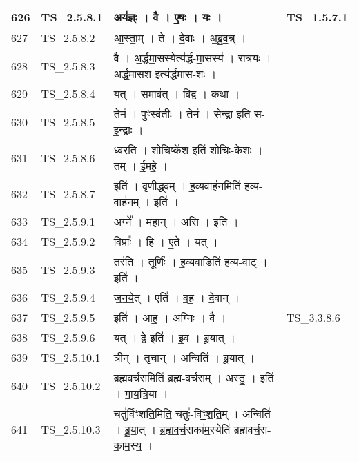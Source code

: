 \documentclass[17pt]{extarticle}
\begin{document}
\begin{longtable}{||p{0.4in}||p{0.9in}||p{4.0in}||p{0.9in}||}
        \hline
            626 & TS\_2.5.8.1 & अय॑ज्ञ्ः   ।   वै   ।   ए॒षः   ।   यः   ।    & TS\_1.5.7.1        \\
        \hline
            627 & TS\_2.5.8.2 & आ॒स्ता॒म्   ।   ते   ।   दे॒वाः   ।   अ॒ब्रु॒व॒न्न्   ।    &      \\
        \hline
            628 & TS\_2.5.8.3 & वै   ।   अ॒र्द्ध॒मा॒सस्येत्य॑र्द्ध{-}मा॒सस्य॑   ।   रात्र॑यः   ।   अ॒र्द्ध॒मा॒स॒श इत्य॑र्द्धमास{-}शः   ।    &      \\
        \hline
            629 & TS\_2.5.8.4 & यत्   ।   स॒माव॑त्   ।   वि॒द्व   ।   क॒था   ।    &      \\
        \hline
            630 & TS\_2.5.8.5 & तेन॑   ।   पुꣳस्व॑तीः   ।   तेन॑   ।   सेन्द्रा॒ इति॒ स{-}इ॒न्द्राः॒   ।    &      \\
        \hline
            631 & TS\_2.5.8.6 & ध्व॒र॒ति॒   ।   शो॒चिष्के॑श॒ इति॑ शो॒चिः{-}के॒शः॒   ।   तम्   ।   ई॒म॒हे॒   ।    &      \\
        \hline
            632 & TS\_2.5.8.7 & इति॑   ।   वृ॒णी॒द्ध्वम्   ।   ह॒व्य॒वाह॑न॒मिति॑ हव्य{-}वाह॑नम्   ।   इति॑   ।    &      \\
        \hline
            633 & TS\_2.5.9.1 & अग्ने᳚   ।   म॒हान्   ।   अ॒सि॒   ।   इति॑   ।    &      \\
        \hline
            634 & TS\_2.5.9.2 & विप्राः᳚   ।   हि   ।   ए॒ते   ।   यत्   ।    &      \\
        \hline
            635 & TS\_2.5.9.3 & तर॑ति   ।   तूर्णिः॑   ।   ह॒व्य॒वाडिति॑ हव्य{-}वाट्   ।   इति॑   ।    &      \\
        \hline
            636 & TS\_2.5.9.4 & ज॒न॒ये॒त्   ।   एति॑   ।   व॒ह॒   ।   दे॒वान्   ।    &      \\
        \hline
            637 & TS\_2.5.9.5 & इति॑   ।   आ॒ह॒   ।   अ॒ग्निः   ।   वै   ।    &  TS\_3.3.8.6       \\
        \hline
            638 & TS\_2.5.9.6 & यत्   ।   द्वे इति॑   ।   इ॒व॒   ।   ब्रू॒यात्   ।    &      \\
        \hline
            639 & TS\_2.5.10.1 & त्रीन्   ।   तृ॒चान्   ।   अन्विति॑   ।   ब्रू॒या॒त्   ।    &      \\
        \hline
            640 & TS\_2.5.10.2 & ब्र॒ह्म॒व॒र्च॒समिति॑ ब्रह्म{-}व॒र्च॒सम्   ।   अ॒स्तु॒   ।   इति॑   ।   गा॒य॒त्रि॒या   ।    &      \\
        \hline
            641 & TS\_2.5.10.3 & चतु॑र्विꣳशति॒मिति॒ चतुः॑{-}विꣳ॒॒श॒ति॒म्   ।   अन्विति॑   ।   ब्रू॒या॒त्   ।   ब्र॒ह्म॒व॒र्च॒सका॑म॒स्येति॑ ब्रह्मवर्च॒स{-}का॒म॒स्य॒   ।    &      \\

\end{longtable}
\end{document}
